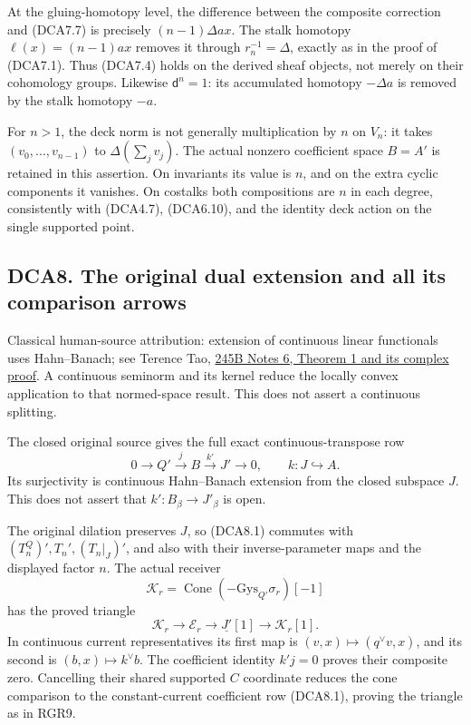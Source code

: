At the gluing-homotopy level, the difference between the composite
correction and (DCA7.7) is precisely \((n-1)\Delta ax\). The stalk
homotopy \(\ell(x)=(n-1)ax\) removes it through \(r_n^{-1}=\Delta\),
exactly as in the proof of (DCA7.1). Thus (DCA7.4) holds on the derived
sheaf objects, not merely on their cohomology groups. Likewise
\(\mathsf d^n=1\): its accumulated homotopy \(-\Delta a\) is removed by
the stalk homotopy \(-a\).

For \(n>1\), the deck norm is not generally multiplication by \(n\) on
\(V_n\): it takes \((v_0,\ldots,v_{n-1})\) to \(\Delta(\sum_jv_j)\). The
actual nonzero coefficient space \(B=A'\) is retained in this assertion.
On invariants its value is \(n\), and on the extra cyclic components it
vanishes. On costalks both compositions are \(n\) in each degree,
consistently with (DCA4.7), (DCA6.10), and the identity deck action on
the single supported point.

\subsection{DCA8. The original dual extension and all its comparison
arrows}\label{dca8.-the-original-dual-extension-and-all-its-comparison-arrows}

Classical human-source attribution: extension of continuous linear functionals uses Hahn--Banach; see Terence Tao, \href{https://terrytao.wordpress.com/2009/01/26/245b-notes-6-duality-and-the-hahn-banach-theorem/}{245B Notes 6, Theorem 1 and its complex proof}. A continuous seminorm and its kernel reduce the locally convex application to that normed-space result. This does not assert a continuous splitting.

The closed original source gives the full exact continuous-transpose row
\[
0\longrightarrow Q'\xrightarrow jB\xrightarrow{k'}J'\longrightarrow0,
\qquad k:J\hookrightarrow A.
\tag{DCA8.1}
\] Its surjectivity is continuous Hahn--Banach extension from the closed
subspace \(J\). This does not assert that \(k':B_\beta\to J'_\beta\) is
open.

The original dilation preserves \(J\), so (DCA8.1) commutes with
\((T_n^Q)',T_n',(T_n|_J)'\), and also with their inverse-parameter maps
and the displayed factor \(n\). The actual receiver \[
\mathscr K_r=\operatorname{Cone}(-\mathrm{Gys}_{Q'}\sigma_r)[-1]
\tag{DCA8.2}
\] has the proved triangle \[
\mathscr K_r\longrightarrow\mathscr E_r
\longrightarrow\underline{J'}[1]\longrightarrow\mathscr K_r[1].
\tag{DCA8.3}
\] In continuous current representatives its first map is
\((v,x)\mapsto(q^\vee v,x)\), and its second is
\((b,x)\mapsto k^\vee b\). The coefficient identity \(k'j=0\) proves
their composite zero. Cancelling their shared supported \(C\) coordinate
reduces the cone comparison to the constant-current coefficient row
(DCA8.1), proving the triangle as in RGR9.

